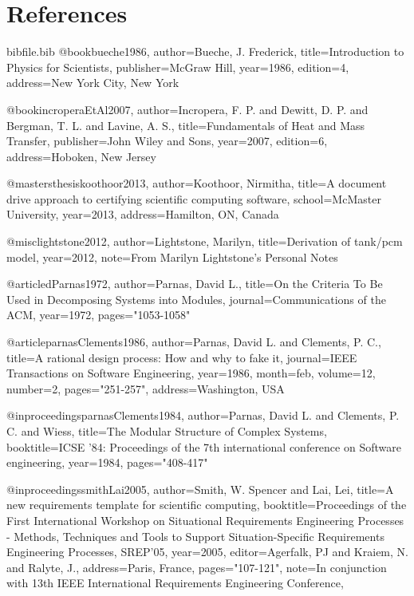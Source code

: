 \documentclass[12pt]{article}
\begin{document}
\section{References}
\label{Sec:References}
\begin{filecontents*}{bibfile.bib}
@book{bueche1986,
author={Bueche, J. Frederick},
title={Introduction to Physics for Scientists},
publisher={McGraw Hill},
year={1986},
edition={4},
address={New York City, New York}}

@book{incroperaEtAl2007,
author={Incropera, F. P. and Dewitt, D. P. and Bergman, T. L. and Lavine, A. S.},
title={Fundamentals of Heat and Mass Transfer},
publisher={John Wiley and Sons},
year={2007},
edition={6},
address={Hoboken, New Jersey}}

@mastersthesis{koothoor2013,
author={Koothoor, Nirmitha},
title={A document drive approach to certifying scientific computing software},
school={McMaster University},
year={2013},
address={Hamilton, ON, Canada}}

@misc{lightstone2012,
author={Lightstone, Marilyn},
title={Derivation of tank/pcm model},
year={2012},
note={From Marilyn Lightstone's Personal Notes}}

@article{dParnas1972,
author={Parnas, David L.},
title={On the Criteria To Be Used in Decomposing Systems into Modules},
journal={Communications of the ACM},
year={1972},
pages={"1053-1058"}}

@article{parnasClements1986,
author={Parnas, David L. and Clements, P. C.},
title={A rational design process: How and why to fake it},
journal={IEEE Transactions on Software Engineering},
year={1986},
month=feb,
volume={12},
number={2},
pages={"251-257"},
address={Washington, USA}}

@inproceedings{parnasClements1984,
author={Parnas, David L. and Clements, P. C. and Wiess},
title={The Modular Structure of Complex Systems},
booktitle={ICSE '84: Proceedings of the 7th international conference on Software engineering},
year={1984},
pages={"408-417"}}

@inproceedings{smithLai2005,
author={Smith, W. Spencer and Lai, Lei},
title={A new requirements template for scientific computing},
booktitle={Proceedings of the First International Workshop on Situational Requirements Engineering Processes - Methods, Techniques and Tools to Support Situation-Specific Requirements Engineering Processes, SREP'05},
year={2005},
editor={Agerfalk, PJ and Kraiem, N. and Ralyte, J.},
address={Paris, France},
pages={"107-121"},
note={In conjunction with 13th IEEE International Requirements Engineering Conference,}}
\end{filecontents*}
\nocite{*}
\printbibliography[heading=none]
\end{document}
